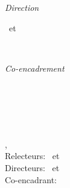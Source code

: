 \begin{titlepage}
	\begin{minipage}[t]{.27\textwidth}
		\raggedleft
		\textit{Direction}
	\end{minipage}
	\hspace*{15pt}
	\begin{minipage}[t]{.65\textwidth}
		\thesisFirstSupervisor\ et \thesisSecondSupervisor
	\end{minipage} \\[0mm]
	
	\begin{minipage}[t]{.27\textwidth}
		\raggedleft
		\textit{Co-encadrement}
	\end{minipage}
	\hspace*{15pt}
	\begin{minipage}[t]{.65\textwidth}
		\thesisFirstAdvisor
	\end{minipage} \\[10mm]

	\thesisDate \\

\end{titlepage}


\hfill
\vfill
{
	\small
	\noindent\textbf{\thesisName} \\
	\textit{\thesisTitle} \\
	\thesisSubject, \thesisDate \\
	Relecteurs: \thesisFirstReviewer\ et \thesisSecondReviewer \\
	Directeurs: \thesisFirstSupervisor\ et \thesisSecondSupervisor \\
	Co-encadrant: \thesisFirstAdvisor \\[1.5em]
	\textbf{\thesisUniversity} \\
	\thesisUniversityInstitute \\
	\thesisUniversityDepartment \\
	\thesisUniversityStreetAddress \\
	\thesisUniversityPostalCode\ \thesisUniversityCity
}
